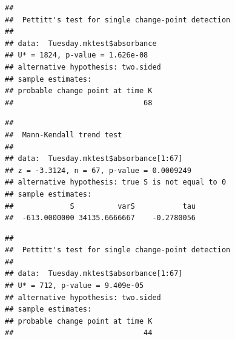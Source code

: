 \documentclass[12pt,]{article}
\newenvironment{Shaded}{\begin{snugshade}}{\end{snugshade}}
\newcommand{\KeywordTok}[1]{\textcolor[rgb]{0.13,0.29,0.53}{\textbf{#1}}}
\newcommand{\DecValTok}[1]{\textcolor[rgb]{0.00,0.00,0.81}{#1}}
\newcommand{\CommentTok}[1]{\textcolor[rgb]{0.56,0.35,0.01}{\textit{#1}}}
\newcommand{\OperatorTok}[1]{\textcolor[rgb]{0.81,0.36,0.00}{\textbf{#1}}}
\newcommand{\NormalTok}[1]{#1}
\begin{document}
\begin{Shaded}
\end{Shaded}

\begin{verbatim}
## 
##  Pettitt's test for single change-point detection
## 
## data:  Tuesday.mktest$absorbance
## U* = 1824, p-value = 1.626e-08
## alternative hypothesis: two.sided
## sample estimates:
## probable change point at time K 
##                              68
\end{verbatim}

\begin{Shaded}
\end{Shaded}

\begin{verbatim}
## 
##  Mann-Kendall trend test
## 
## data:  Tuesday.mktest$absorbance[1:67]
## z = -3.3124, n = 67, p-value = 0.0009249
## alternative hypothesis: true S is not equal to 0
## sample estimates:
##             S          varS           tau 
##  -613.0000000 34135.6666667    -0.2780056
\end{verbatim}

\begin{Shaded}
\end{Shaded}

\begin{verbatim}
## 
##  Pettitt's test for single change-point detection
## 
## data:  Tuesday.mktest$absorbance[1:67]
## U* = 712, p-value = 9.409e-05
## alternative hypothesis: two.sided
## sample estimates:
## probable change point at time K 
##                              44
\end{verbatim}
\end{document}
